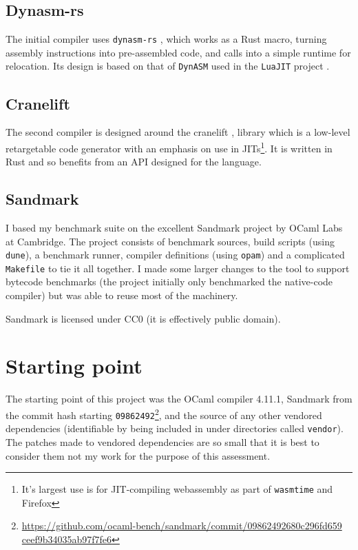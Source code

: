 \subsection{Dynasm-rs}

The initial compiler uses \texttt{dynasm-rs} \cite{dynasmrs}, which works as a Rust macro, turning
assembly instructions into pre-assembled code, and calls into a simple runtime for relocation. Its
design is based on that of \texttt{DynASM} used in the \texttt{LuaJIT} project \cite{dynasm}.

\subsection{Cranelift}

The second compiler is designed around the cranelift \cite{cranelift}, library which is a
low-level retargetable code generator with an emphasis on use in JITs\footnote{It's largest use is
    for JIT-compiling webassembly as part of \texttt{wasmtime} and Firefox}. It is written in
Rust
and so benefits from an API designed for the language.

\subsection{Sandmark}

I based my benchmark suite on the excellent Sandmark project by OCaml Labs at Cambridge. The
project consists of benchmark sources, build scripts (using \texttt{dune}), a benchmark runner,
compiler definitions (using \texttt{opam}) and a complicated \texttt{Makefile} to tie it all
together.  I made some larger changes to the tool to support bytecode benchmarks (the project
initially only benchmarked the native-code compiler) but was able to reuse most of the machinery.

Sandmark is licensed under CC0 (it is effectively public domain).

\section{Starting point}

The starting point of this project was the OCaml compiler 4.11.1, Sandmark from the commit hash
starting
\texttt{09862492}\footnote{\url{https://github.com/ocaml-bench/sandmark/commit/09862492680c296fd659
        ceef9b34035ab97f7fe6}}, and the source of any other vendored dependencies (identifiable
by
being
included in under directories called \texttt{vendor}). The patches made to vendored dependencies
are
so small that it is best to consider them not my work for the purpose of this assessment.

